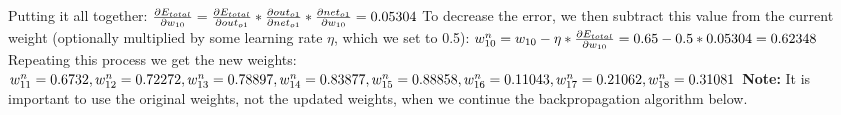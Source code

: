 \documentclass[12pt]{article}
\begin{document}
Putting it all together:
\begin{math}
\newline\newline
\frac{\partial E_{total}}{\partial w_{10}} = \frac{\partial E_{total}}{\partial out_{o1}} * \frac{\partial out_{o1}}{\partial net_{o1}} * \frac{\partial net_{o1}}{\partial w_{10}} = 0.05304
\newline\newline
\end{math}
To decrease the error, we then subtract this value from the current weight (optionally multiplied by some learning rate
\begin{math}\eta\end{math}, which we set to 0.5):
\begin{math}
\newline\newline
w_{10}^{n} = w_{10} - \eta * \frac{\partial E_{total}}{\partial w_{10}} = 0.65 - 0.5 * 0.05304 = 0.62348
\newline\newline
\end{math}
Repeating this process we get the new weights:
\begin{math}
\newline
w_{11}^{n} = 0.6732, w_{12}^{n} = 0.72272, w_{13}^{n} = 0.78897, w_{14}^{n} = 0.83877, w_{15}^{n} = 0.88858,
\newline
w_{16}^{n} = 0.11043, w_{17}^{n} = 0.21062, w_{18}^{n} = 0.31081
\newline\newline
\end{math}
\textbf{Note:} It is important to use the original weights, not the updated weights, when we continue the backpropagation algorithm below.
\end{document}
